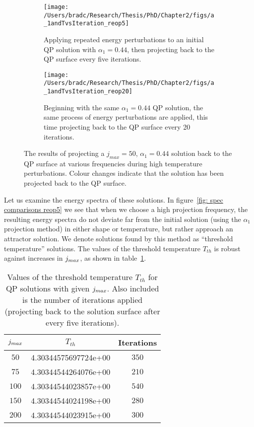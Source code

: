 \documentclass[../PhD.tex]{subfiles}
\begin{document}
\begin{figure}[ht]
	\centering
	\begin{subfigure}[t]{0.47\textwidth}
		\texttt{[image: /Users/bradc/Research/Thesis/PhD/Chapter2/figs/a\_1andTvsIteration\_reop5]}
		\caption{Applying repeated energy perturbations to an initial QP solution with $\alpha_1=0.44$, then projecting back to the QP surface every five iterations.}
		\label{fig: a_1andTa0.2reop5}
	\end{subfigure}
	\hfill
	\begin{subfigure}[t]{0.47\textwidth}
		\texttt{[image: /Users/bradc/Research/Thesis/PhD/Chapter2/figs/a\_1andTvsIteration\_reop20]}
		\caption{Beginning with the same $\alpha_1 = 0.44$ QP solution, the same process of energy perturbations are applied, this time projecting back to the QP surface every 20 iterations.}
		\label{fig: a_1andTa.2reop20}
	\end{subfigure}
	\caption[High temperature solutions resulting from projecting back to the QP solution surface at various frequencies]{The results of projecting a $j_{max}=50$, $\alpha_1 = 0.44$ solution back to the QP surface at various frequencies during high temperature perturbations. Colour changes indicate that the solution has been projected back to the QP surface.}
	\label{fig: reop comparisons}
\end{figure}

Let us examine the energy spectra of these solutions. In figure~\ref{fig: spec comparisons reop5} we see that when we choose a high projection frequency, the resulting energy spectra do not deviate far from the initial solution (using the $\alpha_1$ projection method) in either shape or temperature, but rather approach an attractor solution. We denote solutions found by this method as ``threshold temperature'' solutions. The values of the threshold temperature $T_{th}$ is robust against increases in $j_{max}$, as shown in table~\ref{tab: T_thresh}.

\begin{table}[h]
	\centering
	\begin{tabular}[t]{|c|c|c|}
		\hline
		$j_{max}$ & $T_{th}$ & Iterations \\ \hline
		$50$ & 4.30344575697724e+00 & $350$ \\ \hline
		$75$ & 4.30344544264076e+00 & $210$ \\ \hline
		$100$ & 4.30344544023857e+00 & $540$ \\ \hline
		$150$ & 4.30344544024198e+00 & $280$ \\ \hline
		$200$ & 4.30344544023915e+00 & $300$ \\ \hline
	\end{tabular}
	\caption[Threshold temperatures for different truncation values with constant projection frequency]{Values of the threshold temperature $T_{th}$ for QP solutions with given $j_{max}$. Also included is the number of iterations applied (projecting back to the solution surface after every five iterations).}
	\label{tab: T_thresh}
\end{table}
\end{document}
